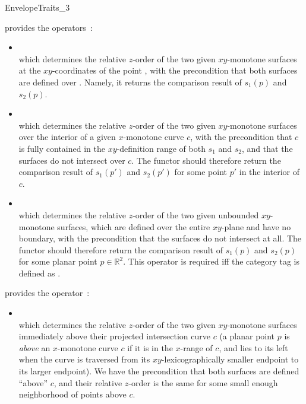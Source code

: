 \begin{ccRefConcept}{EnvelopeTraits_3}
{provides the operators~:
 \begin{itemize}
 \item {}\\
 which determines the relative $z$-order of the two given $xy$-monotone
 surfaces at the $xy$-coordinates of the point , with the
 precondition that both surfaces are defined over . Namely, it
 returns the comparison result of $s_1(p)$ and $s_2(p)$.
%
 \item {}\\
 which determines the relative $z$-order of the two given $xy$-monotone
 surfaces over the interior of a given $x$-monotone curve $c$, with the
 precondition that $c$ is fully contained in the $xy$-definition range
 of both $s_1$ and $s_2$, and that the surfaces do not intersect over
 $c$. The functor should therefore return the comparison result of
 $s_1(p')$ and $s_2(p')$ for some point $p'$ in the interior of $c$.
 \item {}\\
 which determines the relative $z$-order of the two given unbounded
 $xy$-monotone surfaces, which are defined over the entire $xy$-plane and
 have no boundary, with the precondition that the surfaces do not intersect
 at all.
 The functor should therefore return the comparison result of
 $s_1(p)$ and $s_2(p)$ for some planar point $p \in \mathbb{R}^2$.
 This operator is required iff the category tag  
 is defined as .
 \end{itemize}}

{provides the operator~:
 \begin{itemize}
 \item {}\\
 which determines the relative $z$-order of the two given $xy$-monotone
 surfaces immediately above their projected intersection curve
 $c$ (a planar point $p$ is {\em above} an $x$-monotone curve $c$ if it
 is in the $x$-range of $c$, and lies to its left when the curve is
 traversed from its $xy$-lexicographically smaller endpoint to its
 larger endpoint). We have the precondition that both surfaces are
 defined ``above'' $c$, and their relative $z$-order is the same for
 some small enough neighborhood of points above $c$.
 \end{itemize}}


\end{ccRefConcept}
